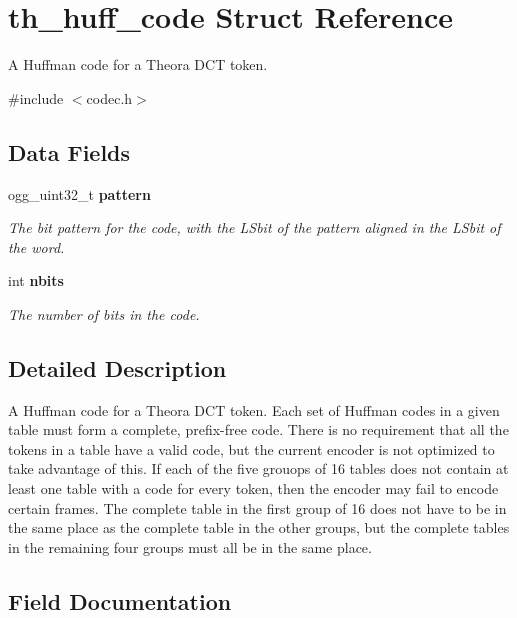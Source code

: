\section{th\_\-huff\_\-code Struct Reference}
\label{structth__huff__code}


A Huffman code for a Theora DCT token.  


{\ttfamily \#include $<$codec.h$>$}\subsection*{Data Fields}
\begin{DoxyCompactItemize}
\item 
ogg\_\-uint32\_\-t {\bf pattern}
\begin{DoxyCompactList}\small\item\em The bit pattern for the code, with the LSbit of the pattern aligned in the LSbit of the word. \item\end{DoxyCompactList}\item 
int {\bf nbits}
\begin{DoxyCompactList}\small\item\em The number of bits in the code. \item\end{DoxyCompactList}\end{DoxyCompactItemize}


\subsection{Detailed Description}
A Huffman code for a Theora DCT token. Each set of Huffman codes in a given table must form a complete, prefix-\/free code. There is no requirement that all the tokens in a table have a valid code, but the current encoder is not optimized to take advantage of this. If each of the five grouops of 16 tables does not contain at least one table with a code for every token, then the encoder may fail to encode certain frames. The complete table in the first group of 16 does not have to be in the same place as the complete table in the other groups, but the complete tables in the remaining four groups must all be in the same place. 

\subsection{Field Documentation}
